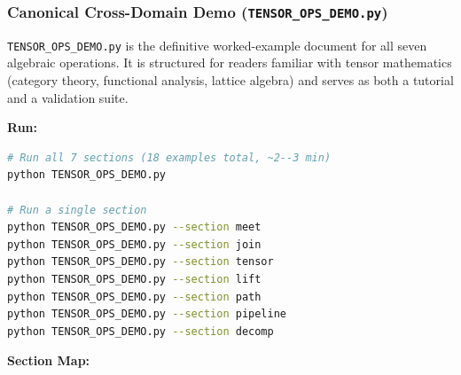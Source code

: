 \documentclass[12pt,a4paper]{article}
\begin{document}
\subsubsection{Canonical Cross-Domain Demo (\texttt{TENSOR\_OPS\_DEMO.py})}

\texttt{TENSOR\_OPS\_DEMO.py} is the definitive worked-example document for all seven algebraic operations. It is structured for readers familiar with tensor mathematics (category theory, functional analysis, lattice algebra) and serves as both a tutorial and a validation suite.

\textbf{Run:}

\begin{lstlisting}[language=bash]
# Run all 7 sections (18 examples total, ~2--3 min)
python TENSOR_OPS_DEMO.py

# Run a single section
python TENSOR_OPS_DEMO.py --section meet
python TENSOR_OPS_DEMO.py --section join
python TENSOR_OPS_DEMO.py --section tensor
python TENSOR_OPS_DEMO.py --section lift
python TENSOR_OPS_DEMO.py --section path
python TENSOR_OPS_DEMO.py --section pipeline
python TENSOR_OPS_DEMO.py --section decomp
\end{lstlisting}

\textbf{Section Map:}
\end{document}
